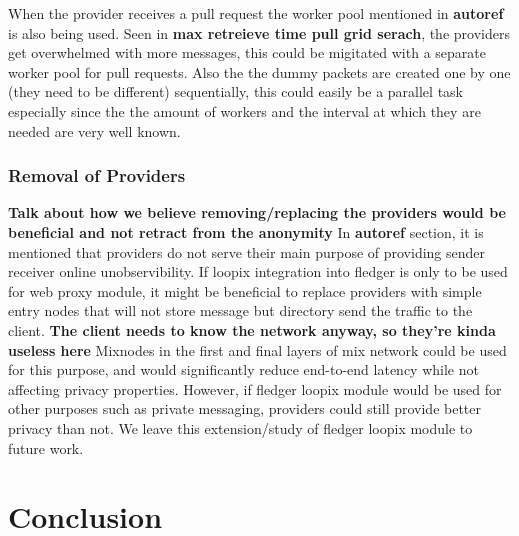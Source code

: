 \documentclass[a4paper,11pt,oneside]{report}
\begin{document}
When the provider receives a pull request the worker pool mentioned in \textbf{autoref} is also being used. Seen in \textbf{max retreieve time pull grid serach}, the providers get overwhelmed with more messages, this could be migitated with a separate worker pool for pull requests. Also the the dummy packets are created one by one (they  need to be different) sequentially, this could easily be a parallel task especially since the the amount of workers and the interval at which they are needed are very well known. 

\subsection{Removal of Providers}

\textbf{Talk about how we believe removing/replacing the providers would be beneficial and not retract from the anonymity}
In \textbf{autoref} section, it is mentioned that providers do not serve their main purpose of providing sender receiver online unobservibility. If loopix integration into fledger is only to be used for web proxy module, it might be beneficial to replace providers with simple entry nodes that will not store message but directory send the traffic to the client. \textbf{The client needs to know the network anyway, so they're kinda useless here} Mixnodes in the first and final layers of mix network could be used for this purpose, and would significantly reduce end-to-end latency while not affecting privacy properties. However, if fledger loopix module would be used for other purposes such as private messaging, providers could still provide better privacy than not. We leave this extension/study of fledger loopix module to future work.

\chapter{Conclusion}


\cleardoublepage
{}
{}
\printbibliography

%
%
\end{document}
